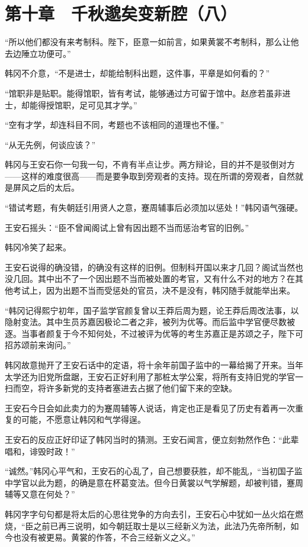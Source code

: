 \section{第十章　千秋邈矣变新腔（八）}

“所以他们都没有来考制科。陛下，臣意一如前言，如果黄裳不考制科，那么让他去边陲立功便可。”

韩冈不介意，“不是进士，却能给制科出题，这件事，平章是如何看的？”

“馆职非是贴职。能得馆职，皆有考试，能够通过方可留于馆中。赵彦若虽非进士，却能得授馆职，足可见其才学。”

“空有才学，却连科目不同，考题也不该相同的道理也不懂。”

“从无先例，何谈应该？”

韩冈与王安石你一句我一句，不肯有半点让步。两方辩论，目的并不是驳倒对方——这样的难度很高——而是要争取到旁观者的支持。现在所谓的旁观者，自然就是屏风之后的太后。

“错试考题，有失朝廷引用贤人之意，蹇周辅事后必须加以惩处！”韩冈语气强硬。

王安石摇头：“臣不曾闻阁试上曾有因出题不当而惩治考官的旧例。”

韩冈冷笑了起来。

王安石说得的确没错，的确没有这样的旧例。但制科开国以来才几回？阁试当然也没几回。其中出不了一个因出题不当而被处置的考官，又有什么不对的地方？在其他考试上，因为出题不当而受惩处的官员，决不是没有，韩冈随手就能举出来。

“韩冈记得熙宁初年，国子监学官颜复曾以王莽后周为题，论王莽后周改法事，以隐射变法。其中生员苏嘉因极论二者之非，被列为优等。而后监中学官便尽数被逐。当事者颜复于今不知何处，不过被评为优等的考生苏嘉正是苏颂之子，陛下可招苏颂前来询问。”

韩冈故意抛开了王安石话中的定语，将十余年前国子监中的一幕给揭了开来。当年太学还为旧党所盘踞，王安石正好利用了那桩太学公案，将所有支持旧党的学官一扫而空，将许多新党的支持者塞进去占据了他们留下来的空缺。

王安石今日会如此卖力的为蹇周辅等人说话，肯定也正是看见了历史有着再一次重复的可能，不愿意让韩冈和气学得逞。

王安石的反应正好印证了韩冈当时的猜测。王安石闻言，便立刻勃然作色：“此辈唱和，诽毁时政！”

“诚然。”韩冈心平气和，王安石的心乱了，自己想要获胜，却不能乱，“当初国子监中学官以此为题，的确是意在杯葛变法。但今日黄裳以气学解题，却被判错，蹇周辅等又意在何处？”

韩冈字字句句都是将太后的心思往党争的方向去引，王安石心中犹如一丛火焰在燃烧，“臣之前已再三说明，如今朝廷取士是以三经新义为法，此法乃先帝所制，如今也没有被更易。黄裳的作答，不合三经新义之义。”


